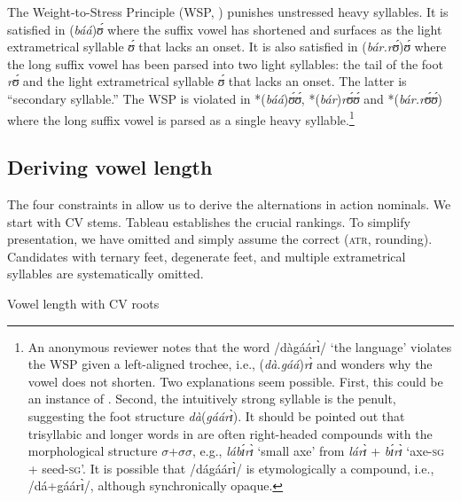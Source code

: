 \documentclass[output=paper
,newtxmath
,modfonts
,nonflat]{langsci/langscibook}
\begin{document}
The Weight-to-Stress Principle (WSP, \citealt{Prince1990}) punishes unstressed heavy syllables. It is satisfied in (\textit{báá})\textit{ʊ́} where the suffix vowel has shortened and surfaces as the light extrametrical syllable \textit{ʊ́} that lacks an onset. It is also satisfied in (\textit{bár.rʊ́})\textit{ʊ́} where the long suffix vowel has been parsed into two light syllables: the tail of the foot \textit{rʊ́} and the light extrametrical syllable \textit{ʊ́} that lacks an onset. The latter is  ``{secondary syllable}.'' The WSP is violated in *(\textit{báá})\textit{ʊ́ʊ́}, *(\textit{bár})\textit{rʊ́ʊ́} and *(\textit{bár.rʊ́ʊ́}) where the long suffix vowel is parsed as a single heavy syllable.\footnote{An anonymous reviewer notes that the word /dàgáárɪ̀/ ‘the  language’ violates the WSP given a left-aligned trochee, i.e., (\textit{d\`a.g\'a\'a})\textit{r\`ɪ} and wonders why the vowel does not shorten. Two explanations seem possible. First, this could be an instance of  \citep{Kiparsky1993}. Second, the intuitively strong syllable is the penult, suggesting the foot structure \textit{dà}(\textit{gá}\textit{á}\textit{rɪ̀}). It should be pointed out that trisyllabic and longer words in  are often right-headed compounds with the morphological structure $\sigma $+$\sigma \sigma $, e.g., \textit{lá}\textit{bɪ́}\textit{rɪ̀} ‘small axe’ from \textit{lá}\textit{rɪ̀} + \textit{bɪ́}\textit{rɪ̀} ‘axe-\textsc{sg} + seed-\textsc{sg}’. It is possible that /dágáárɪ̀/ is etymologically a compound, i.e., /dá+gáárɪ̀/, although synchronically opaque.} 

\subsection{Deriving vowel length}

The four constraints in  allow us to derive the  alternations in action nominals. We start with CV stems. Tableau  establishes the crucial rankings. To simplify presentation, we have omitted  and simply assume the correct  (\textsc{atr}, rounding). Candidates with ternary feet, degenerate feet, and multiple extrametrical syllables are systematically omitted.

\ea 
Vowel length with CV roots \label{ex:anttila:3}
\end{document}

